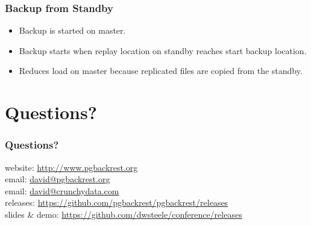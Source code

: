 \begin{frame}
    \frametitle{Backup from Standby}

    \begin{itemize}
        \item Backup is started on master.\pause
        \item Backup starts when replay location on standby reaches start backup location.\pause
        \item Reduces load on master because replicated files are copied from the standby.
    \end{itemize}
\end{frame}

\section{Questions?}

\begin{frame}
    \frametitle{Questions?}

    website: \url{http://www.pgbackrest.org}\\
    \vspace{1em}
    email: \href{mailto:david@pgbackrest.org}{david@pgbackrest.org} \\
    email: \href{mailto:david@crunchydata.com}{david@crunchydata.com}\\
    \vspace{1em}
    releases: \url{https://github.com/pgbackrest/pgbackrest/releases}\\
    \vspace{1em}
    slides \& demo: \url{https://github.com/dwsteele/conference/releases}\\
\end{frame}


